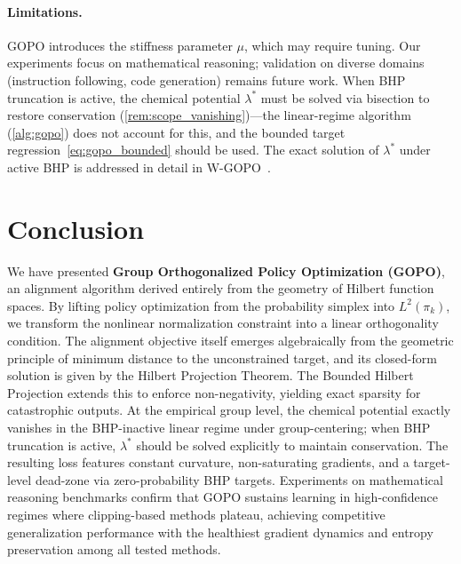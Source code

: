 \documentclass[11pt]{article}
\theoremstyle{definition}
\theoremstyle{remark}
\newcommand{\pik}{\pi_k}
\begin{document}
\paragraph{Limitations.}
GOPO introduces the stiffness parameter $\mu$, which may require tuning. Our experiments focus on mathematical reasoning; validation on diverse domains (instruction following, code generation) remains future work. When BHP truncation is active, the chemical potential $\lambda^*$ must be solved via bisection to restore conservation (\cref{rem:scope_vanishing})---the linear-regime algorithm (\cref{alg:gopo}) does not account for this, and the bounded target regression~\eqref{eq:gopo_bounded} should be used. The exact solution of $\lambda^*$ under active BHP is addressed in detail in W-GOPO~\cite{Wang2025WGOPO}.

\section{Conclusion}
\label{sec:conclusion}

We have presented \textbf{Group Orthogonalized Policy Optimization (GOPO)}, an alignment algorithm derived entirely from the geometry of Hilbert function spaces. By lifting policy optimization from the probability simplex into $L^2(\pik)$, we transform the nonlinear normalization constraint into a linear orthogonality condition. The alignment objective itself emerges algebraically from the geometric principle of minimum distance to the unconstrained target, and its closed-form solution is given by the Hilbert Projection Theorem. The Bounded Hilbert Projection extends this to enforce non-negativity, yielding exact sparsity for catastrophic outputs. At the empirical group level, the chemical potential exactly vanishes in the BHP-inactive linear regime under group-centering; when BHP truncation is active, $\lambda^*$ should be solved explicitly to maintain conservation. The resulting loss features constant curvature, non-saturating gradients, and a target-level dead-zone via zero-probability BHP targets. Experiments on mathematical reasoning benchmarks confirm that GOPO sustains learning in high-confidence regimes where clipping-based methods plateau, achieving competitive generalization performance with the healthiest gradient dynamics and entropy preservation among all tested methods.
\end{document}
